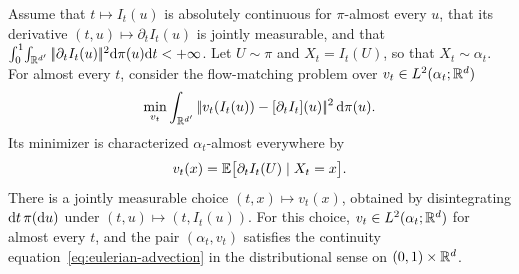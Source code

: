 \begin{prop}\label{prop-flow-matching-vector-field}
	Assume that $t\mapsto I_t(u)$ is absolutely continuous for $\pi$-almost every $u$, that its derivative $(t,u)\mapsto\partial_t I_t(u)$ is jointly measurable, and that \(\int_0^1\!\int_{\mathbb{R}^{d'}}|\!| \partial_t I_t(u) |\!|^2\mathrm{d}\pi(u)\mathrm{d} t<+\infty\).
	Let \(U\sim\pi\) and \(X_t=I_t(U)\), so that \(X_t\sim\alpha_t\).
	For almost every $t$, consider the flow-matching problem over \(v_t\in L^2(\alpha_t;\mathbb{R}^d)\)
	\begin{equation}
		\min_{v_t} \int_{\mathbb{R}^{d'}} |\!| v_t(I_t(u)) - [\partial_t I_t](u) |\!|^2 \, \mathrm{d}\pi(u). \label{eq:flow-matching}
	\end{equation}
	Its minimizer is characterized $\alpha_t$-almost everywhere by
	\begin{equation}\label{eq:flow-match-conditional}
		v_t(x)=\mathbb{E}\bigl[\partial_t I_t(U)\mid X_t=x\bigr].
	\end{equation}
	There is a jointly measurable choice \((t,x)\mapsto v_t(x)\), obtained by disintegrating \(\mathrm{d} t\,\pi(\mathrm{d} u)\) under \((t,u)\mapsto(t,I_t(u))\). For this choice, $v_t\in L^2(\alpha_t;\mathbb{R}^d)$ for almost every $t$, and the pair $(\alpha_t,v_t)$ satisfies the continuity equation~\eqref{eq:eulerian-advection} in the distributional sense on $(0,1)\times\mathbb{R}^d$.
\end{prop}

